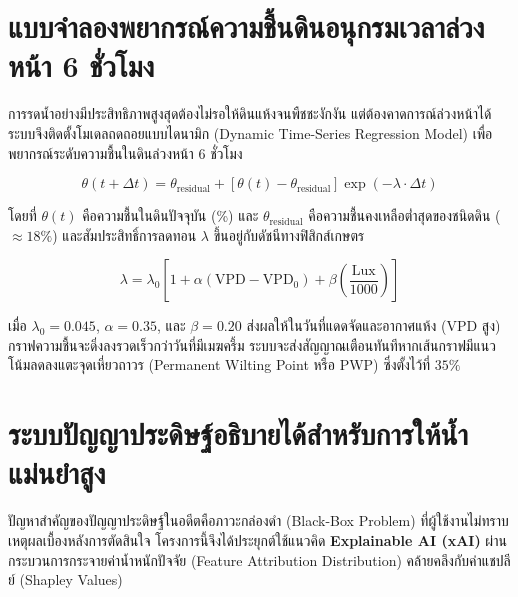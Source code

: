 \section{แบบจำลองพยากรณ์ความชื้นดินอนุกรมเวลาล่วงหน้า 6 ชั่วโมง}

การรดน้ำอย่างมีประสิทธิภาพสูงสุดต้องไม่รอให้ดินแห้งจนพืชชะงักงัน แต่ต้องคาดการณ์ล่วงหน้าได้ ระบบจึงติดตั้งโมเดลถดถอยแบบไดนามิก (Dynamic Time-Series Regression Model) เพื่อพยากรณ์ระดับความชื้นในดินล่วงหน้า 6 ชั่วโมง

\begin{equation}
\theta(t + \Delta t) = \theta_{\text{residual}} + \left[ \theta(t) - \theta_{\text{residual}} \right] \exp\left( -\lambda \cdot \Delta t \right)
\end{equation}

โดยที่ $\theta(t)$ คือความชื้นในดินปัจจุบัน (\%) และ $\theta_{\text{residual}}$ คือความชื้นคงเหลือต่ำสุดของชนิดดิน ($\approx 18\%$) และสัมประสิทธิ์การลดทอน $\lambda$ ขึ้นอยู่กับดัชนีทางฟิสิกส์เกษตร

\begin{equation}
\lambda = \lambda_0 \left[ 1 + \alpha (\text{VPD} - \text{VPD}_0) + \beta \left( \frac{\text{Lux}}{1000} \right) \right]
\end{equation}

เมื่อ $\lambda_0 = 0.045$, $\alpha = 0.35$, และ $\beta = 0.20$ ส่งผลให้ในวันที่แดดจัดและอากาศแห้ง (VPD สูง) กราฟความชื้นจะดิ่งลงรวดเร็วกว่าวันที่มีเมฆครึ้ม ระบบจะส่งสัญญาณเตือนทันทีหากเส้นกราฟมีแนวโน้มลดลงแตะจุดเหี่ยวถาวร (Permanent Wilting Point หรือ PWP) ซึ่งตั้งไว้ที่ $35\%$

\section{ระบบปัญญาประดิษฐ์อธิบายได้สำหรับการให้น้ำแม่นยำสูง}

ปัญหาสำคัญของปัญญาประดิษฐ์ในอดีตคือภาวะกล่องดำ (Black-Box Problem) ที่ผู้ใช้งานไม่ทราบเหตุผลเบื้องหลังการตัดสินใจ โครงการนี้จึงได้ประยุกต์ใช้แนวคิด \textbf{Explainable AI (xAI)} ผ่านกระบวนการกระจายค่าน้ำหนักปัจจัย (Feature Attribution Distribution) คล้ายคลึงกับค่าแชปลีย์ (Shapley Values)

